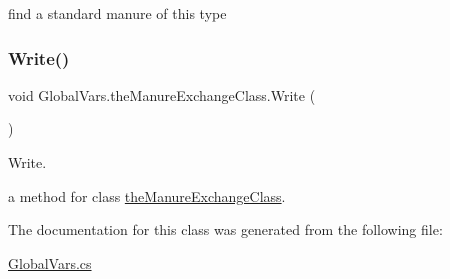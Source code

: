 find a standard manure of this type \mbox{\label{class_global_vars_1_1the_manure_exchange_class_a8e150f91a33d2d0a723b2d1646087da1}} 
\subsubsection{\texorpdfstring{Write()}{Write()}}
{\footnotesize\ttfamily void Global\+Vars.\+the\+Manure\+Exchange\+Class.\+Write (\begin{DoxyParamCaption}{ }\end{DoxyParamCaption})\hspace{0.3cm}{\ttfamily [inline]}}



Write. 

a method for class \mbox{\hyperlink{class_global_vars_1_1the_manure_exchange_class}{the\+Manure\+Exchange\+Class}}. 

The documentation for this class was generated from the following file\+:\begin{DoxyCompactItemize}
\item 
\mbox{\hyperlink{_global_vars_8cs}{Global\+Vars.\+cs}}\end{DoxyCompactItemize}
